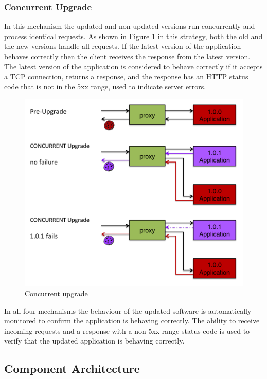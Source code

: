 \documentclass[a4paper,11pt,twoside]{report}
\begin{document}
\subsubsection*{Concurrent Upgrade}
In this mechanism the updated and non-updated versions run concurrently and process identical requests.  As shown in Figure \ref{concurrent_upgrade} in this strategy, both the old and the new versions handle all requests.  If the latest version of the application behaves correctly then the client receives the response from the latest version.  The latest version of the application is considered to behave correctly if it accepts a TCP connection, returns a response, and the response has an HTTP status code that is not in the 5xx range, used to indicate server errors.
   
\begin{figure}[!ht]
  \centering
     \includegraphics[scale=0.30]{concurrent_upgrade}
  \caption{Concurrent upgrade}
  \label{concurrent_upgrade}
\end{figure}

In all four mechanisms the behaviour of the updated software is automatically monitored to confirm the application is behaving correctly. The ability to receive incoming requests and a response with a non 5xx range status code is used to verify that the updated application is behaving correctly. 

\clearpage

\subsection{Component Architecture}
\end{document}
